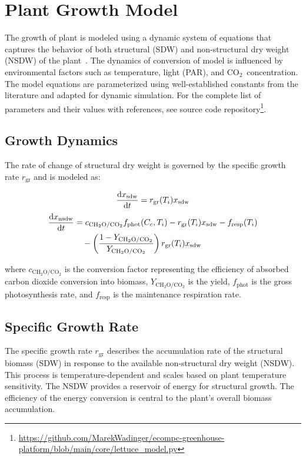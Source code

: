 \documentclass[conference]{IEEEtran}
\newcommand{\ui}[2]{#1_{\mathrm{#2}}}
\newcommand{\coo}{\ensuremath{\mathrm{CO_2}}}
\newcommand{\chho}{\ensuremath{\mathrm{CH_2O}}}
\begin{document}
\section{Plant Growth Model}\label{sec:lettuce_growth}
The growth of plant is modeled using a dynamic system of equations that captures the behavior of both structural (SDW) and non-structural dry weight (NSDW) of the plant~\cite{VANHENTEN199455}. The dynamics of conversion of  model is influenced by environmental factors such as temperature, light (PAR), and \coo\ concentration. The model equations are parameterized using well-established constants from the literature and adapted for dynamic simulation. For the complete list of parameters and their values with references, see source code repository\footnote{\url{https://github.com/MarekWadinger/ecompc-greenhouse-platform/blob/main/core/lettuce_model.py}}.

\subsection{Growth Dynamics} The rate of change of structural dry weight is governed by the specific growth rate \( \ui{r}{gr} \) and is modeled as:

\begin{equation}
    \diff{\ui{x}{sdw}}{t} = \ui{r}{gr}(T_i) \ui{x}{sdw}
\end{equation}
\begin{equation}
    \begin{aligned}
        \diff{\ui{x}{nsdw}}{t} & = c_{\chho/\coo} \ui{f}{phot}(C_c, T_i) - \ui{r}{gr}(T_i) \ui{x}{sdw} - \ui{f}{resp}(T_i)    \\
                               & \quad - \left( \frac{1 - Y_{\chho/\coo}}{Y_{\chho/\coo}} \right) \ui{r}{gr}(T_i) \ui{x}{sdw}
    \end{aligned}
\end{equation}

where \( c_{\chho/\coo} \) is the conversion factor representing the efficiency of absorbed carbon dioxide conversion into biomass, \( Y_{\chho/\coo} \) is the yield, \( \ui{f}{phot} \) is the gross photosynthesis rate, and \( \ui{f}{resp} \) is the maintenance respiration rate.

\subsection{Specific Growth Rate} The specific growth rate \( \ui{r}{gr} \) describes the accumulation rate of the structural biomass (SDW) in response to the available non-structural dry weight (NSDW). This process is temperature-dependent and scales based on plant temperature sensitivity. The NSDW provides a reservoir of energy for structural growth. The efficiency of the energy conversion is central to the plant's overall biomass accumulation.
\end{document}
